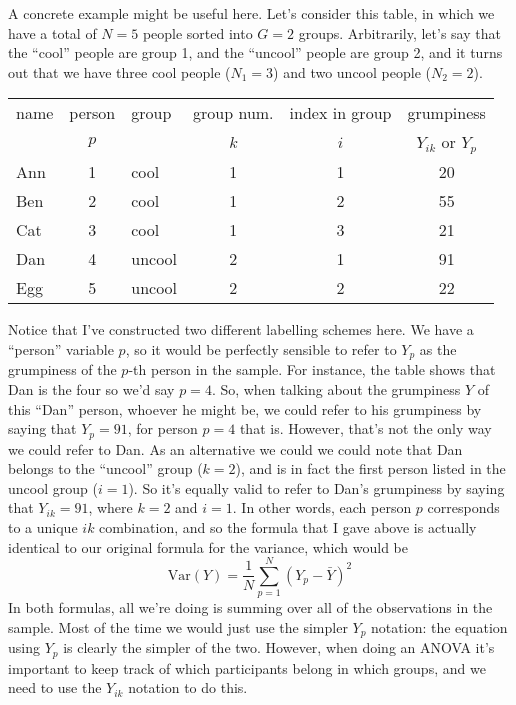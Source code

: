 A concrete example might be useful here. Let's consider this table, in which we have a total of $N=5$ people sorted into $G=2$ groups. Arbitrarily, let's say that the ``cool'' people are group 1, and the ``uncool'' people are group 2, and it turns out that we have three cool people ($N_1 = 3$) and two uncool people ($N_2 = 2$).
\begin{center}
\begin{tabular}{lclccc} \hline 
name & person & group & group num. & index in group & grumpiness \\
& $p$ &          & $k$ & $i$ & $Y_{ik}$ or $Y_p$ \\ \hline
Ann & 1 & cool   &  1  &  1  & 20 \\
Ben & 2 & cool   &  1  &  2  & 55\\
Cat & 3 & cool   &  1  &  3  & 21\\
Dan & 4 & uncool &  2  &  1  & 91\\
Egg & 5 & uncool &  2  &  2  & 22\\
\end{tabular}
\end{center}
Notice that I've constructed two different labelling schemes here. We have a ``person'' variable $p$, so it would be perfectly sensible to refer to $Y_p$ as the grumpiness of the $p$-th person in the sample. For instance, the table shows that Dan is the four so we'd say $p = 4$. So, when talking about the grumpiness $Y$ of this ``Dan'' person, whoever he might be, we could refer to his grumpiness by saying that $Y_p = 91$, for person $p = 4$ that is.  However, that's not the only way we could refer to Dan. As an alternative we could we could note that Dan belongs to the ``uncool'' group ($k = 2$), and is in fact the first person listed in the uncool group ($i = 1$). So it's equally valid to refer to Dan's grumpiness by saying that $Y_{ik} = 91$, where $k = 2$ and $i = 1$. In other words, each person $p$ corresponds to a unique $ik$ combination, and so the formula that I gave above is actually identical to our original formula for the variance, which would be
$$
\mbox{Var}(Y) = \frac{1}{N} \sum_{p=1}^N  \left(Y_{p} - \bar{Y} \right)^2
$$
In both formulas, all we're doing is summing over all of the observations in the sample. Most of the time we would just use the simpler $Y_p$ notation: the equation using $Y_p$ is clearly the simpler of the two. However, when doing an ANOVA it's important to keep track of which participants belong in which groups, and we need to use the $Y_{ik}$ notation to do this. 


